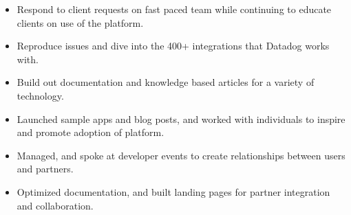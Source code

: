 \documentclass[10pt,a4paper,ragged2e]{altacv}
\begin{document}

\makecvheader



\begin{itemize}
\item Respond to client requests on fast paced team while continuing to educate clients on use of the platform.
\item Reproduce issues and dive into the 400+ integrations that Datadog works with.
\item Build out documentation and knowledge based articles for a variety of technology.
\end{itemize}
\divider

\begin{itemize}
\item Launched sample apps and blog posts, and worked with individuals to inspire and promote adoption of platform.
\item Managed, and spoke at developer events to create relationships between users and partners.
\item Optimized documentation, and built landing pages for partner integration and collaboration.
\end{itemize}
\divider
\end{document}
